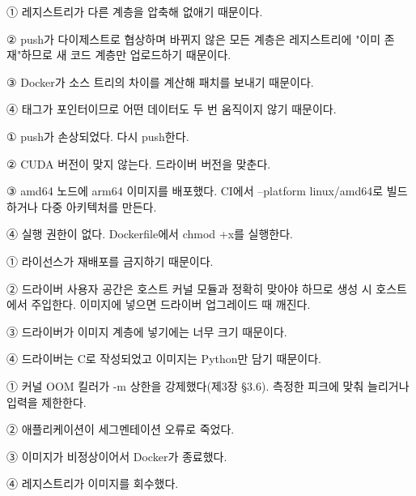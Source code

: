 
\begin{tbboptions}
  \item ① 레지스트리가 다른 계층을 압축해 없애기 때문이다.
  \item ② push가 다이제스트로 협상하며 바뀌지 않은 모든 계층은 레지스트리에 "이미 존재"하므로 새 코드 계층만 업로드하기 때문이다.
  \item ③ Docker가 소스 트리의 차이를 계산해 패치를 보내기 때문이다.
  \item ④ 태그가 포인터이므로 어떤 데이터도 두 번 움직이지 않기 때문이다.
\end{tbboptions}


\begin{tbboptions}
  \item ① push가 손상되었다. 다시 push한다.
  \item ② CUDA 버전이 맞지 않는다. 드라이버 버전을 맞춘다.
  \item ③ amd64 노드에 arm64 이미지를 배포했다. CI에서 --platform linux/amd64로 빌드하거나 다중 아키텍처를 만든다.
  \item ④ 실행 권한이 없다. Dockerfile에서 chmod +x를 실행한다.
\end{tbboptions}


\begin{tbboptions}
  \item ① 라이선스가 재배포를 금지하기 때문이다.
  \item ② 드라이버 사용자 공간은 호스트 커널 모듈과 정확히 맞아야 하므로 생성 시 호스트에서 주입한다. 이미지에 넣으면 드라이버 업그레이드 때 깨진다.
  \item ③ 드라이버가 이미지 계층에 넣기에는 너무 크기 때문이다.
  \item ④ 드라이버는 C로 작성되었고 이미지는 Python만 담기 때문이다.
\end{tbboptions}


\begin{tbboptions}
  \item ① 커널 OOM 킬러가 -m 상한을 강제했다(제3장 §3.6). 측정한 피크에 맞춰 늘리거나 입력을 제한한다.
  \item ② 애플리케이션이 세그멘테이션 오류로 죽었다.
  \item ③ 이미지가 비정상이어서 Docker가 종료했다.
  \item ④ 레지스트리가 이미지를 회수했다.
\end{tbboptions}

